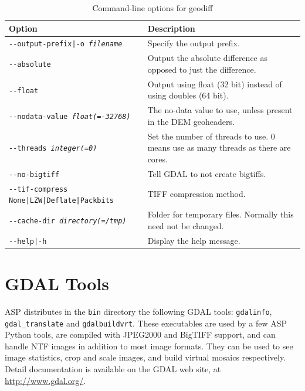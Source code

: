 \begin{longtable}{|l|p{7.5cm}|}
\caption{Command-line options for geodiff}
\label{tbl:geodiff}
\endfirsthead
\endhead
\endfoot
\endlastfoot
\hline
Option & Description \\ \hline \hline
\texttt{-\/-output-prefix|-o \textit{filename}} & Specify the output prefix. \\ \hline
\texttt{-\/-absolute} & Output the absolute difference as opposed to just the difference. \\ \hline
\texttt{-\/-float} & Output using float (32 bit) instead of using doubles (64 bit). \\ \hline
\texttt{-\/-nodata-value \textit{float(=-32768)}} & The no-data value to use, unless present in the DEM geoheaders. \\ \hline
\texttt{-\/-threads \textit{integer(=0)}} & Set the number of threads to use. 0 means use as many threads as there are cores.\\ \hline
\texttt{-\/-no-bigtiff} & Tell GDAL to not create bigtiffs.\\ \hline
\texttt{-\/-tif-compress None|LZW|Deflate|Packbits} & TIFF compression method.\\ \hline
\texttt{-\/-cache-dir \textit{directory(=/tmp)}} & Folder for temporary files. Normally this need not be changed.\\ \hline
\hline
\texttt{-\/-help|-h} & Display the help message. \\ \hline
\end{longtable}


\section{GDAL Tools}

ASP distributes in the \texttt{bin} directory the following GDAL tools: \texttt{gdalinfo}, \texttt{gdal\_translate} and \texttt{gdalbuildvrt}.
These executables are used by a few ASP Python tools, are compiled with JPEG2000 and BigTIFF support, and can handle NTF images in addition to most image formats.
They can be used to see image statistics, crop and scale images, and build virtual mosaics respectively. Detail documentation is available on the GDAL web site,
at \url{http://www.gdal.org/}.
\label{imagecalc}
